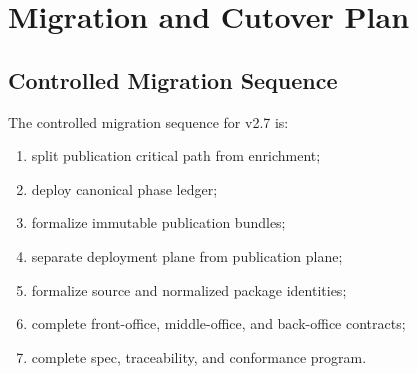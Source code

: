 \chapter{Migration and Cutover Plan}
\section{Controlled Migration Sequence}
The controlled migration sequence for v2.7 is:
\begin{enumerate}[leftmargin=1.2cm]
    \item split publication critical path from enrichment;
    \item deploy canonical phase ledger;
    \item formalize immutable publication bundles;
    \item separate deployment plane from publication plane;
    \item formalize source and normalized package identities;
    \item complete front-office, middle-office, and back-office contracts;
    \item complete spec, traceability, and conformance program.
\end{enumerate}
